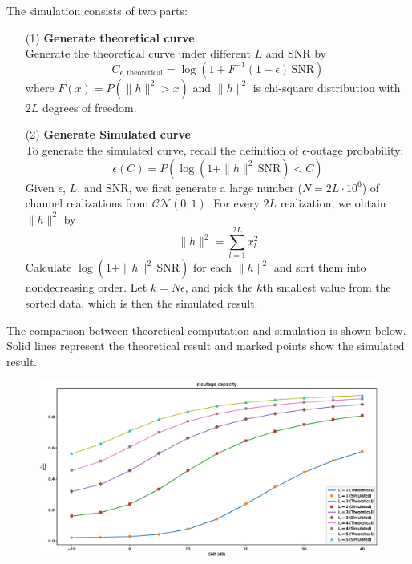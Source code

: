 The simulation consists of two parts:
\vspace{-5pt}
\begin{itemize}
	\item[(1)] \textbf{Generate theoretical curve \hfill \\}
	Generate the theoretical curve under different $L$ and SNR by
	\begin{equation*}
		C_{\epsilon, \text{theoretical}} = \log\left(1 + F^{-1}(1-\epsilon) \, \text{SNR}\right)
	\end{equation*}
	where $F(x) = P\left(\|h\|^{2} > x\right)$ and $\|h\|^{2}$ is chi-square distribution with $2L$ degrees of freedom.
	\item[(2)] \textbf{Generate Simulated curve \hfill \\}
	To generate the simulated curve, recall the definition of $\epsilon$-outage probability:
	\begin{equation*}
		\epsilon\left(C\right) = P\left(\log(1 + \|h\|^{2} \, \text{SNR}) < C\right)
	\end{equation*} 
	Given $\epsilon$, $L$, and SNR, we first generate a large number ($N = 2L \cdot 10^6$) of channel 
	realizations from $\mathcal{CN}(0,1)$. For every $2L$ realization, we obtain $\|h\|^2$ by
	\begin{equation*}
		\|h\|^2 = \sum_{l=1}^{2L} x_l^2
	\end{equation*}
	Calculate $\log(1 + \|h\|^{2} \, \text{SNR})$ for each $\|h\|^2$ and sort them into nondecreasing 
	order. Let $k = N\epsilon$, and pick the $k$th smallest value from the sorted data, which
	is then the simulated result.

\end{itemize}

The comparison between theoretical computation and simulation is shown below. Solid lines 
represent the theoretical result and marked points show the simulated result. 
\begin{figure}[H]
	\centering
	\includegraphics[scale = 0.5]{epsilon_outage.eps}
\end{figure}